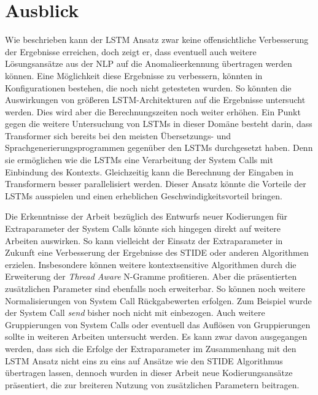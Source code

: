 \section{Ausblick}
Wie beschrieben kann der \ac{LSTM} Ansatz zwar keine offensichtliche Verbesserung der Ergebnisse erreichen, doch zeigt er, dass eventuell auch weitere Lösungsansätze aus der \ac{NLP} auf die Anomalieerkennung übertragen werden können.
Eine Möglichkeit diese Ergebnisse zu verbessern, könnten in Konfigurationen bestehen, die noch nicht getesteten wurden.
So könnten die Auswirkungen von größeren \ac{LSTM}-Architekturen auf die Ergebnisse untersucht werden.
Dies wird aber die Berechnungszeiten noch weiter erhöhen.
Ein Punkt gegen die weitere Untersuchung von \acp{LSTM} in dieser Domäne besteht darin, dass Transformer sich bereits bei den meisten Übersetzungs-  und Sprachgenerierungsprogrammen  gegenüber den \acp{LSTM} durchgesetzt haben. 
Denn sie ermöglichen wie die \acp{LSTM} eine Verarbeitung der System Calls mit Einbindung des Kontexts.
Gleichzeitig kann die Berechnung der Eingaben in Transformern besser parallelisiert werden.
Dieser Ansatz könnte die Vorteile der \acp{LSTM} ausspielen und einen erheblichen Geschwindigkeitsvorteil bringen.

Die Erkenntnisse der Arbeit bezüglich des Entwurfs neuer Kodierungen für Extraparameter der System Calls könnte sich hingegen direkt auf weitere Arbeiten auswirken.
So kann vielleicht der Einsatz der Extraparameter in Zukunft eine Verbesserung der Ergebnisse des \ac{STIDE} oder anderen Algorithmen erzielen.
Insbesondere können weitere kontextsensitive Algorithmen durch die Erweiterung der \textit{Thread Aware} N-Gramme profitieren. 
Aber die präsentierten zusätzlichen Parameter sind ebenfalls noch erweiterbar.
So können noch weitere Normalisierungen von System Call Rückgabewerten erfolgen.
Zum Beispiel wurde der System Call \textit{send} bisher noch nicht mit einbezogen.
Auch weitere Gruppierungen von System Calls oder eventuell das Auflösen von Gruppierungen sollte in weiteren Arbeiten untersucht werden.
Es kann zwar davon ausgegangen werden, dass sich die Erfolge der Extraparameter im Zusammenhang mit den \ac{LSTM} Ansatz nicht eins zu eins auf Ansätze wie den \ac{STIDE} Algorithmus übertragen lassen, dennoch wurden in dieser Arbeit neue Kodierungsansätze präsentiert, die zur breiteren Nutzung von zusätzlichen Parametern beitragen.

